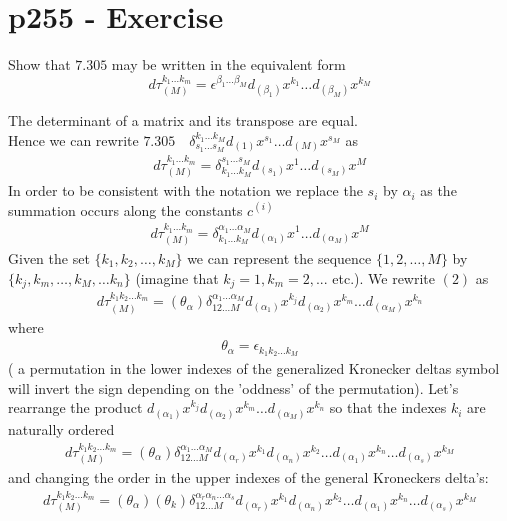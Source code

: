\section{p255 - Exercise }
\begin{tcolorbox}
Show that $\mathbf{7.305}$ may be written in the equivalent form
$$d\tau_{(M)}^{k_1\dots k_m}= \epsilon^{\beta_1\dots \beta_M}d_{(\beta_1)}x^{k_1}\dots d_{(\beta_M)}x^{k_M}$$
\end{tcolorbox}
The determinant of a matrix and its transpose are equal.\\
Hence we can rewrite $\mathbf{7.305} \quad \delta^{k_1\dots k_M}_{s_1\dots s_M}d_{(1)}x^{s_1}\dots d_{(M)}x^{s_M}$ as
\begin{align}
d\tau_{(M)}^{k_1\dots k_m}=\delta_{k_1\dots k_M}^{s_1\dots s_M}d_{(s_1)}x^{1}\dots d_{(s_M)}x^{M}
\end{align}
In order to be consistent with the notation we replace the $s_i$ by $\alpha_i$ as the summation occurs along the constants $c^{(i)}$
\begin{align}
d\tau_{(M)}^{k_1\dots k_m}=\delta_{k_1\dots k_M}^{\alpha_1\dots \alpha_M}d_{(\alpha_1)}x^{1}\dots d_{(\alpha_M)}x^{M}
\end{align}
Given the set $\{k_1, k_2,\dots , k_M\}$ we can represent the sequence $\{1,2,\dots , M\}$ by $\{k_j, k_m,\dots ,k_M,\dots k_n\}$ (imagine that $k_j=1, k_m=2,...$ etc.). We rewrite $(2)$ as
\begin{align}
d\tau_{(M)}^{k_1 k_2\dots k_m}=(\theta_{\alpha}) \delta_{1 2 \dots M}^{\alpha_1\dots \alpha_M}d_{(\alpha_1)}x^{k_j}d_{(\alpha_2)}x^{k_m}\dots d_{(\alpha_M)}x^{k_n}
\end{align}
where 
\begin{align}
\theta_{\alpha} = \epsilon_{k_1 k_2\dots k_M}
\end{align}
( a permutation in the lower indexes of the generalized Kronecker deltas symbol will invert the sign depending on the 'oddness' of the permutation).
Let's rearrange the product $d_{(\alpha_1)}x^{k_j}d_{(\alpha_2)}x^{k_m}\dots d_{(\alpha_M)}x^{k_n}$ so that the indexes $k_i$ are naturally ordered
\begin{align}
d\tau_{(M)}^{k_1 k_2\dots k_m}=(\theta_{\alpha}) \delta_{1 2 \dots M}^{\alpha_1\dots \alpha_M}d_{(\alpha_r)}x^{k_1}d_{(\alpha_n)}x^{k_2}\dots d_{(\alpha_1)}x^{k_n}\dots d_{(\alpha_s)}x^{k_M}
\end{align}
and changing the order in the upper indexes of the general Kroneckers delta's:
\begin{align}
d\tau_{(M)}^{k_1 k_2\dots k_m}=(\theta_{\alpha})(\theta_{k}) \delta_{1 2 \dots M}^{\alpha_r\alpha_n \dots \alpha_s}d_{(\alpha_r)}x^{k_1}d_{(\alpha_n)}x^{k_2}\dots d_{(\alpha_1)}x^{k_n}\dots d_{(\alpha_s)}x^{k_M}
\end{align}
